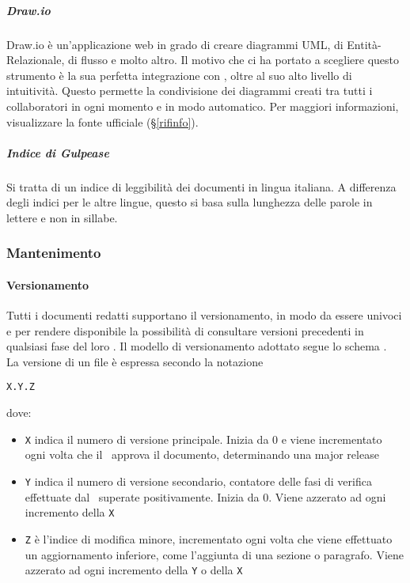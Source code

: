 			\subparagraph{Draw.io}
			Draw.io è un'applicazione web in grado di creare diagrammi UML, di Entità-Relazionale, di flusso e molto altro. Il motivo che ci ha portato
			a scegliere questo strumento è la sua perfetta integrazione con , oltre al suo alto livello di intuitività.
			Questo permette la condivisione dei diagrammi creati tra tutti i collaboratori in ogni momento e in modo automatico.
			Per maggiori informazioni, visualizzare la fonte ufficiale (\S\ref{rifinfo}).

			\subparagraph{Indice di Gulpease}
			Si tratta di un indice di leggibilità dei documenti in lingua italiana. A differenza degli indici per le altre lingue, questo si basa sulla
			lunghezza delle parole in lettere e non in sillabe.

		\subsubsection{Mantenimento}

			\paragraph{Versionamento} \label{Versionamento}
			Tutti i documenti redatti supportano il versionamento, in modo da essere univoci e per rendere disponibile la possibilità di consultare versioni
			precedenti in qualsiasi fase del loro .
			Il modello di versionamento adottato segue lo schema .\\La versione di un file è espressa secondo la notazione
			\begin{center}
				\texttt{X.Y.Z}
			\end{center}
			\indent dove:
			\begin{itemize}
				\item \texttt{X} indica il numero di versione principale. Inizia da 0 e viene incrementato ogni volta che il \Res\ approva il documento,
					determinando una major release
				\item \texttt{Y} indica il numero di versione secondario, contatore delle fasi di verifica effettuate dal \Ver\ superate positivamente.
					Inizia da 0. Viene azzerato ad ogni incremento della \texttt{X}
				\item \texttt{Z} è l'indice di modifica minore, incrementato ogni volta che viene effettuato un aggiornamento inferiore, come l'aggiunta
					di una sezione o paragrafo. Viene azzerato ad ogni incremento della \texttt{Y} o della \texttt{X}
			\end{itemize}

